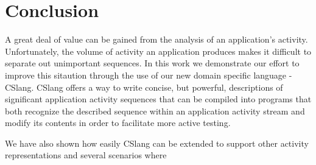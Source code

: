 \section{Conclusion}
\label{sec:Conclusion}
%
%

A great deal of value can be gained from the analysis of an application's
activity.
Unfortunately,
the volume of activity an application produces makes it difficult
to separate out
unimportant sequences.
In this work we demonstrate our effort to improve this sitaution through the use
of our new domain specific language - CSlang.
CSlang offers a way to write concise, but powerful,
descriptions of significant application activity sequences
that can be compiled into programs that both recognize the described sequence
within an application activity stream and modify its contents in order to
facilitate more active testing.

We have also shown how easily CSlang can be extended to support other activity
representations and several scenarios where

